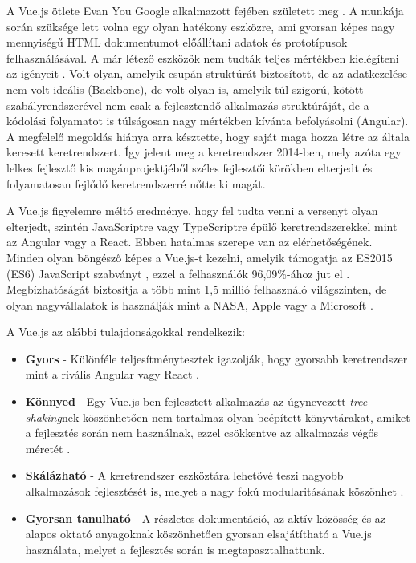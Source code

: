 \documentclass[12pt]{article}
\begin{document}
A Vue.js ötlete Evan You Google alkalmazott fejében született meg \cite{VUE_BOOK}. A munkája során szüksége lett volna egy olyan hatékony eszközre, ami gyorsan képes nagy mennyiségű HTML dokumentumot előállítani adatok és prototípusok felhasználásával. A már létező eszközök nem tudták teljes mértékben kielégíteni az igényeit \cite{VUE_BOOK}. Volt olyan, amelyik csupán struktúrát biztosított, de az adatkezelése nem volt ideális (Backbone), de volt olyan is, amelyik túl szigorú, kötött szabályrendszerével nem csak a fejlesztendő alkalmazás struktúráját, de a kódolási folyamatot is túlságosan nagy mértékben kívánta befolyásolni (Angular). A megfelelő megoldás hiánya arra késztette, hogy saját maga hozza létre az általa keresett keretrendszert. Így jelent meg a keretrendszer 2014-ben, mely azóta egy lelkes fejlesztő kis magánprojektjéből széles fejlesztői körökben elterjedt és folyamatosan fejlődő keretrendszerré nőtte ki magát.

A Vue.js figyelemre méltó eredménye, hogy fel tudta venni a versenyt olyan elterjedt, szintén JavaScriptre vagy TypeScriptre épülő keretrendszerekkel mint az Angular vagy a React. Ebben hatalmas szerepe van az elérhetőségének. Minden olyan böngésző képes a Vue.js-t kezelni, amelyik támogatja az ES2015 (ES6) JavaScript szabványt \cite{VUE_SUPP}, ezzel a felhasználók 96,09\%-ához jut el \cite{ES2015_USAGE}. Megbízhatóságát biztosítja a több mint 1,5 millió felhasználó világszinten, de olyan nagyvállalatok is használják mint a NASA, Apple vagy a Microsoft \cite{VUE_COMPANIES}.

A Vue.js az alábbi tulajdonságokkal rendelkezik:
\begin{itemize}
	\item[]\textbf{Gyors}
	- Különféle teljesítménytesztek igazolják, hogy gyorsabb keretrendszer mint a rivális Angular vagy React \cite{FRAMEWORK_PERF}.
	\item[]\textbf{Könnyed}
	- Egy Vue.js-ben fejlesztett alkalmazás az úgynevezett \textit{tree-shaking}nek köszönhetően nem tartalmaz olyan beépített könyvtárakat, amiket a fejlesztés során nem használnak, ezzel csökkentve az alkalmazás végős méretét \cite{VUE_LW}.
	\item[]\textbf{Skálázható}
	- A keretrendszer eszköztára lehetővé teszi nagyobb alkalmazások fejlesztését is, melyet a nagy fokú modularitásának köszönhet \cite{VUE_SCALE}.
	\item[]\textbf{Gyorsan tanulható}
	- A részletes dokumentáció, az aktív közösség és az alapos oktató anyagoknak köszönhetően gyorsan elsajátítható a Vue.js használata, melyet a fejlesztés során is megtapasztalhattunk.
\end{itemize}
\end{document}
